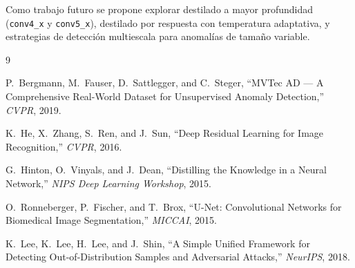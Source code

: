 \documentclass[conference]{IEEEtran}
\begin{document}
Como trabajo futuro se propone explorar destilado a mayor profundidad
(\texttt{conv4\_x} y \texttt{conv5\_x}), destilado por respuesta con
temperatura adaptativa, y estrategias de detección multiescala para
anomalías de tamaño variable.

\begin{thebibliography}{9}

P.~Bergmann, M.~Fauser, D.~Sattlegger, and C.~Steger,
``MVTec AD --- A Comprehensive Real-World Dataset for Unsupervised Anomaly Detection,''
\textit{CVPR}, 2019.

K.~He, X.~Zhang, S.~Ren, and J.~Sun,
``Deep Residual Learning for Image Recognition,''
\textit{CVPR}, 2016.

G.~Hinton, O.~Vinyals, and J.~Dean,
``Distilling the Knowledge in a Neural Network,''
\textit{NIPS Deep Learning Workshop}, 2015.

O.~Ronneberger, P.~Fischer, and T.~Brox,
``U-Net: Convolutional Networks for Biomedical Image Segmentation,''
\textit{MICCAI}, 2015.

K.~Lee, K.~Lee, H.~Lee, and J.~Shin,
``A Simple Unified Framework for Detecting Out-of-Distribution Samples and
Adversarial Attacks,''
\textit{NeurIPS}, 2018.

\end{thebibliography}
\end{document}
